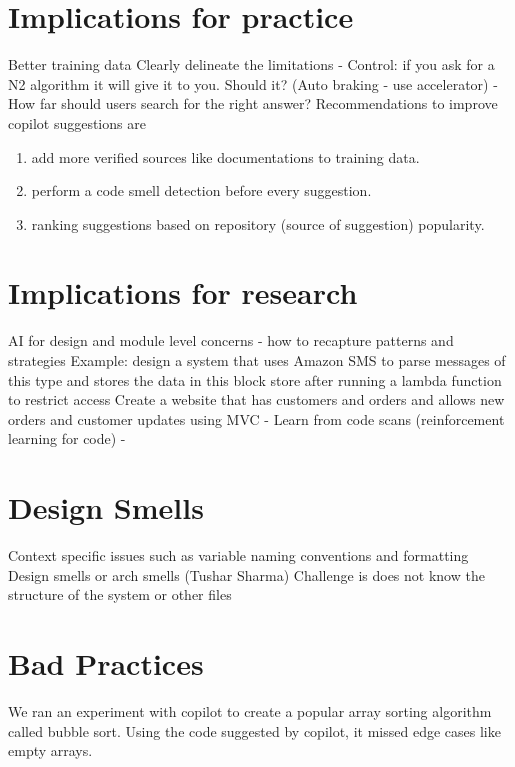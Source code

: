 \label{chapter:eval}

\section{Implications for practice}
	Better training data
	Clearly delineate the limitations
- Control: if you ask for a N2 algorithm it will give it to you. Should it? (Auto braking - use accelerator)
- How far should users search for the right answer? 
Recommendations to improve copilot suggestions are
\begin{enumerate}
    \item add more verified sources like documentations to training data.
    \item perform a code smell detection before every suggestion.
    \item ranking suggestions based on repository (source of suggestion) popularity.
\end{enumerate}
\section{Implications for research}
	AI for design and module level concerns - how to recapture patterns and strategies
	Example: design a system that uses Amazon SMS to parse messages of this type and stores the data in this block store after running a lambda function to restrict access
	Create a website that has customers and orders and allows new orders and customer updates using MVC
- Learn from code scans (reinforcement learning for code) 
- 
\section{Design Smells}
	Context specific issues such as variable naming conventions and formatting 
	Design smells or arch smells (Tushar Sharma) 
	Challenge is does not know the structure of the system or other files 
	
\section{Bad Practices}
    We ran an experiment with copilot to create a popular array sorting algorithm called bubble sort. Using the code suggested by copilot, it missed edge cases like empty arrays.